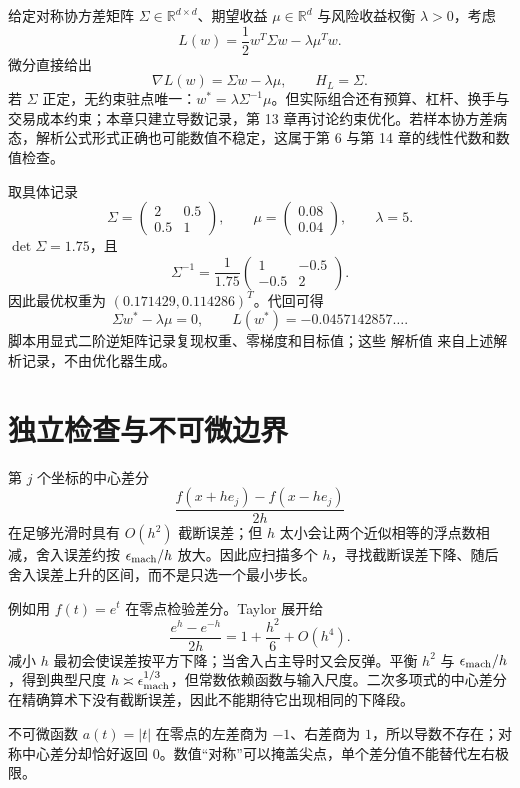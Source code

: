 
给定对称协方差矩阵 $\Sigma\in\mathbb R^{d\times d}$、期望收益 $\mu\in\mathbb R^d$ 与风险收益权衡 $\lambda>0$，考虑
\[
 L(w)=\frac12w^T\Sigma w-\lambda\mu^Tw.
\]
微分直接给出
\[
 \nabla L(w)=\Sigma w-\lambda\mu,
 \qquad H_L=\Sigma.
\]
若 $\Sigma$ 正定，无约束驻点唯一：$w^*=\lambda\Sigma^{-1}\mu$。但实际组合还有预算、杠杆、换手与交易成本约束；本章只建立导数记录，第 13 章再讨论约束优化。若样本协方差病态，解析公式形式正确也可能数值不稳定，这属于第 6 与第 14 章的线性代数和数值检查。

取具体记录
\[
 \Sigma=\begin{pmatrix}2&0.5\\0.5&1\end{pmatrix},\qquad
 \mu=\begin{pmatrix}0.08\\0.04\end{pmatrix},\qquad
 \lambda=5.
\]
$\det\Sigma=1.75$，且
\[
 \Sigma^{-1}=\frac1{1.75}
 \begin{pmatrix}1&-0.5\\-0.5&2\end{pmatrix}.
\]
因此最优权重为 $(0.171429,0.114286)^T$。代回可得
\[
 \Sigma w^*-\lambda\mu=0,
 \qquad L(w^*)=-0.0457142857\ldots.
\]
脚本用显式二阶逆矩阵记录复现权重、零梯度和目标值；这些 解析值 来自上述解析记录，不由优化器生成。

\section{独立检查与不可微边界}

第 $j$ 个坐标的中心差分
\[
 \frac{f(x+he_j)-f(x-he_j)}{2h}
\]
在足够光滑时具有 $O(h^2)$ 截断误差；但 $h$ 太小会让两个近似相等的浮点数相减，舍入误差约按 $\epsilon_{\rm mach}/h$ 放大。因此应扫描多个 $h$，寻找截断误差下降、随后舍入误差上升的区间，而不是只选一个最小步长。

例如用 $f(t)=e^t$ 在零点检验差分。Taylor 展开给
\[
 \frac{e^h-e^{-h}}{2h}=1+\frac{h^2}{6}+O(h^4).
\]
减小 $h$ 最初会使误差按平方下降；当舍入占主导时又会反弹。平衡 $h^2$ 与 $\epsilon_{\rm mach}/h$，得到典型尺度 $h\asymp\epsilon_{\rm mach}^{1/3}$，但常数依赖函数与输入尺度。二次多项式的中心差分在精确算术下没有截断误差，因此不能期待它出现相同的下降段。

不可微函数 $a(t)=|t|$ 在零点的左差商为 $-1$、右差商为 $1$，所以导数不存在；对称中心差分却恰好返回 0。数值“对称”可以掩盖尖点，单个差分值不能替代左右极限。


